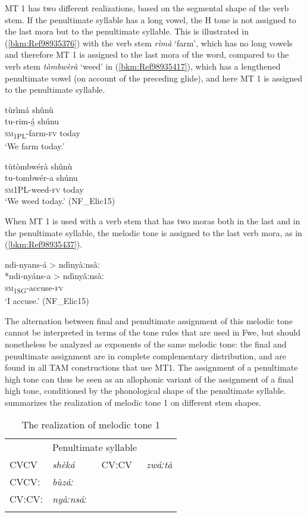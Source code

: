 MT 1 has two different realizations, based on the segmental shape of the verb stem. If the penultimate syllable has a long vowel, the H tone is not assigned to the last mora but to the penultimate syllable. This is illustrated in (\ref{bkm:Ref98935376}) with the verb stem \textit{rìmà} ‘farm’, which has no long vowels and therefore MT 1 is assigned to the last mora of the word, compared to the verb stem \textit{tòmbwèrà} ‘weed’ in (\ref{bkm:Ref98935417}), which has a lengthened penultimate vowel (on account of the preced\-ing glide), and here MT 1 is assigned to the penultimate syllable.

\ea
\label{bkm:Ref98935376}
tùrìmá shûnù\\
\gll tu-rim-á̲    shúnu\\
\textsc{sm}\textsubscript{1PL}-farm-\textsc{fv}  today\\
\glt ‘We farm today.’
\z

\ea
\label{bkm:Ref98935417}
tùtòmbwérà shûnù\\
\gll tu-tombwér-a  shúnu\\
\textsc{sm}1PL-weed-\textsc{fv}  today\\
\glt ‘We weed today.’ (NF\_Elic15)
\z

When MT 1 is used with a verb stem that has two moras both in the last and in the penultimate syllable, the melodic tone is assigned to the last verb mora, as in (\ref{bkm:Ref98935437}).

\ea
\label{bkm:Ref98935437}
ndi-nyans-á > ndìnyàːnsâː\\
*ndi-nyáns-a > ndìnyâːnsàː\\
\textsc{sm}\textsubscript{1SG}-accuse-\textsc{fv}\\
\glt ‘I accuse.’ (NF\_Elic15)
\z

The alternation between final and penultimate assignment of this melodic tone cannot be inter\-preted in terms of the tone rules that are used in Fwe, but should nonetheless be analyzed as exponents of the same melodic tone: the final and penultimate assignment are in complete complementary distribution, and are found in all TAM constructions that use MT1. The assignment of a penultimate high tone can thus be seen as an allophonic variant of the assignment of a final high tone, conditioned by the phonologi\-cal shape of the penultimate syllable.  summarizes the realization of melodic tone 1 on different stem shapes.

\begin{table}
\label{bkm:Ref489535613}\caption{\label{tab:3:7}The realization of melodic tone 1}

\begin{tabular}{llll}
\lsptoprule
\multicolumn{2}{c}{Last mora} & \multicolumn{2}{c}{Penultimate syllable}\\
\cmidrule(r){1-2}\cmidrule(l){3-4}
CVCV & {\itshape shèká} & CVːCV & {\itshape zwáːtà}\\
CVCVː & {\itshape bùzáː} &  & \\
CVːCVː & \textit{nyàːnsáː} &  & \\
\lspbottomrule
\end{tabular}
\end{table}

